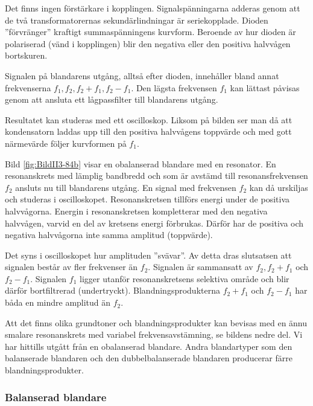 Det finns ingen förstärkare i kopplingen.
Signalspänningarna adderas genom att de två transformatorernas
sekundärlindningar är seriekopplade.
Dioden ''förvränger'' kraftigt summaspänningens kurvform.
Beroende av hur dioden är polariserad (vänd i kopplingen) blir den negativa
eller den positiva halvvågen bortskuren.

\newpage
Signalen på blandarens utgång, alltså efter dioden, innehåller
bland annat frekvenserna \(f_1, f_2, f_2+f_1, f_2-f_1\).
Den lägsta frekvensen \(f_1\) kan lättast påvisas genom att ansluta ett
lågpassfilter till blandarens utgång.

Resultatet kan studeras med ett oscilloskop.
Liksom på bilden ser man då att kondensatorn laddas upp till den positiva
halvvågens toppvärde och med gott närmevärde följer kurvformen på \(f_1\).

\newpage
{}

Bild \ref{fig:BildII3-84b} visar en obalanserad blandare med en resonator.
En resonanskrets med lämplig bandbredd och som är avstämd till
resonansfrekvensen \(f_2\) ansluts nu till blandarens utgång.
En signal med frekvensen \(f_2\) kan då urskiljas och studeras i oscilloskopet.
Resonanskretsen tillförs energi under de positiva halvvågorna.
Energin i resonanskretsen kompletterar med den negativa halvvågen, varvid en
del av kretsens energi förbrukas.
Därför har de positiva och negativa halvvågorna inte samma amplitud (toppvärde).

\newpage
Det syns i oscilloskopet hur amplituden ''svävar''.
Av detta dras slutsatsen att signalen består av fler frekvenser än \(f_2\).
Signalen är sammansatt av \(f_2, f_2+f_1\) och \(f_2-f_1\).
Signalen \(f_1\) ligger utanför resonanskretsens selektiva område och blir
därför bortfiltrerad (undertryckt).
Blandningsprodukterna \(f_2 + f_1\) och \(f_2 - f_1\) har båda en mindre
amplitud än \(f_2\).

Att det finns olika grundtoner och blandningsprodukter kan bevisas med en ännu
smalare resonanskrets med variabel frekvensavstämning, se bildens nedre del.
Vi har hittills utgått från en obalanserad blandare.
Andra blandartyper som den balanserade blandaren och den dubbelbalanserade
blandaren producerar färre blandningsprodukter.

\newpage

\subsubsection{Balanserad blandare}

